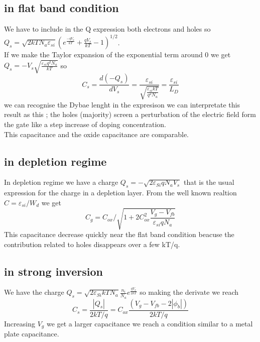 \subsection{in flat band condition}
We have to include in the Q expression both electrons and holes so $Q_s=\sqrt{2kTN_a\varepsilon_{si}}(e^{\frac{-qV_s}{kT}}+\frac{qV_s}{kT}-1)^{1/2}$.\\ If we make the Taylor expansion of the exponential term around 0 we get $Q_s=-V_s\sqrt{\frac{\varepsilon_{si}q^2N_a}{kT}}$ so 
\begin{equation}
C_s=\frac{d(-Q_s)}{dV_s}=\frac{\varepsilon_{si}}{\sqrt{\frac{\varepsilon_{si}kT}{q^2 N_a}}}=\frac{\varepsilon_{si}}{L_D}
\end{equation}
we can recognise the Dybae lenght in the expresison we can interpretate this result as this ; the holes (majority) screen a perturbation of the electric field form the gate like a step increase of doping concentration.\\
This capacitance and the oxide capacitance are comparable.\\

\subsection{in depletion regime}
In depletion regime we have a charge $Q_s=-\sqrt{2\varepsilon_{Si} q N_a V_s}$ that is the usual expression for the charge in a depletion layer. From the well known realtion $C=\varepsilon_{si}/W_d$ we get 
\begin{equation}
C_g=C_{ox}/\sqrt{1+2C_{ox}^2 \frac{V_g-V_{fb}}{\varepsilon_{si}qN_a}}
\end{equation}
This capacitance decrease quickly near the flat band condition beacuse the contribution related to holes disappears over a few kT/q.\\

\subsection{in strong inversion} 
We have the charge $Q_s=\sqrt{2\varepsilon_{Si}kTN_a}\frac{n_i}{N_a}e^{\frac{qV_s}{2kT}}$ so making the derivate we reach 
\begin{equation}
C_s=\frac{|Q_s|}{2kT/q}=C_{ox}\frac{(V_g-V_{fb}-2|\phi_b|)}{2kT/q}
\end{equation}
Increasing $V_g$ we get a larger capacitance we reach a condition similar to a metal plate capacitance.\\

